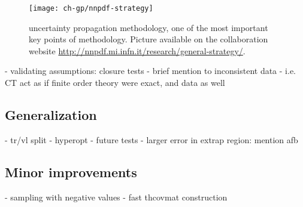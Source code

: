 

\begin{figure}
	\centering
	\texttt{[image: ch-gp/nnpdf-strategy]}
	\caption{
    \nnpdf uncertainty propagation methodology, one of the most important key
    points of \nnpdf methodology.
    Picture available on the collaboration website
    \url{http://nnpdf.mi.infn.it/research/general-strategy/}.
	}
	\label{fig:gp/nnpdf}
\end{figure}

- validating assumptions: closure tests
  - brief mention to inconsistent data
  - i.e. CT act as if finite order theory were exact, and data as well

\subsection{Generalization}

- tr/vl split
- hyperopt
- future tests
- larger error in extrap region: mention afb

\subsection{Minor improvements}

- sampling with negative values
- fast thcovmat construction
